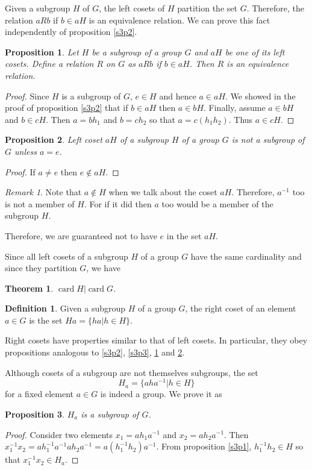 \documentclass{article}
\DeclareMathOperator{\card}{card}
\theoremstyle{plain}
\newtheorem{thm}{Theorem}
\numberwithin{thm}{section}
\theoremstyle{plain}
\newtheorem{prop}{Proposition}
\numberwithin{prop}{section}
\theoremstyle{definition}
\newtheorem{defn}{Definition}
\numberwithin{defn}{section}
\theoremstyle{remark}
\newtheorem*{rem}{Remark}
\numberwithin{equation}{section}
\begin{document}
Given a subgroup $H$ of $G$, the left cosets of $H$ partition the set $G$.
Therefore, the relation $a R b$ if $b \in aH$ is an equivalence relation. We
can prove this fact independently of proposition \ref{s3p2}.

\begin{prop}\label{s3p4}
Let $H$ be a subgroup of a group $G$ and $aH$ be one of its left cosets. Define
a relation $R$ on $G$ as $a R b$ if $b \in aH$. Then $R$ is an equivalence
relation.
\end{prop}
\begin{proof}
Since $H$ is a subgroup of $G$, $e \in H$ and hence $a \in aH$. We showed
in the proof of proposition \ref{s3p2} that if $b \in aH$ then $a \in bH$.
Finally, assume $a \in bH$ and $b \in cH$. Then $a = bh_1$ and $b = ch_2$ 
so that $a = c(h_1h_2)$. Thus $a \in cH$.
\end{proof}

\begin{prop}\label{s3p5}
Left coset $aH$ of a subgroup $H$ of a group $G$ is not a subgroup of $G$
unless $a = e$.
\end{prop}
\begin{proof}
If $a \ne e$ then $e \notin aH$.
\end{proof}

\begin{rem}
Note that $a \notin H$ when we talk about the coset $aH$. Therefore, $a^{-1}$
too is not a member of $H$. For if it did then $a$ too would be a member of 
the subgroup $H$.

Therefore, we are guaranteed not to have $e$ in the set $aH$.
\end{rem}

Since all left cosets of a subgroup $H$ of a group $G$ have the same cardinality
and since they partition $G$, we have
\begin{thm}\label{s3t1}
$\card H | \card G$.
\end{thm}

\begin{defn}\label{s3d3}
Given a subgroup $H$ of a group $G$, the right coset of an element $a \in G$
is the set $Ha = \{ha | h \in H\}$.
\end{defn}

Right cosets have properties similar to that of left cosets. In particular,
they obey propositions analogous to \ref{s3p2}, \ref{s3p3}, \ref{s3p4} and
\ref{s3p5}.

Although cosets of a subgroup are not themselves subgroups, the set
\begin{equation}\label{s3e1}
H_a = \{aha^{-1} | h \in H\}
\end{equation}
for a fixed element $a \in G$ is indeed a group. We prove it as 
\begin{prop}\label{s3p6}
$H_a$ is a subgroup of $G$.
\end{prop}
\begin{proof}
Consider two elements $x_1 = ah_1a^{-1}$ and $x_2 = ah_2a^{-1}$. Then $x_1^{-1}
x_2 = ah_1^{-1}a^{-1}ah_2 a^{-1} = a(h_1^{-1}h_2) a^{-1}$. From proposition
\ref{s3p1}, $h_1^{-1}h_2 \in H$ so that $x_1^{-1}x_2 \in H_a$.
\end{proof}
\end{document}
